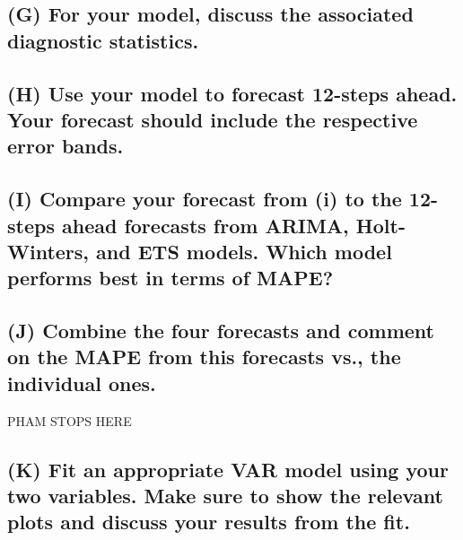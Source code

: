 \documentclass[
  10.5pt,
]{article}
\begin{document}
\hypertarget{g-for-your-model-discuss-the-associated-diagnostic-statistics.}{%
\subsection{(G) For your model, discuss the associated diagnostic
statistics.}\label{g-for-your-model-discuss-the-associated-diagnostic-statistics.}}

\hypertarget{h-use-your-model-to-forecast-12-steps-ahead.-your-forecast-should-include-the-respective-error-bands.}{%
\subsection{(H) Use your model to forecast 12-steps ahead. Your forecast
should include the respective error
bands.}\label{h-use-your-model-to-forecast-12-steps-ahead.-your-forecast-should-include-the-respective-error-bands.}}

\hypertarget{i-compare-your-forecast-from-i-to-the-12-steps-ahead-forecasts-from-arima-holt-winters-and-ets-models.-which-model-performs-best-in-terms-of-mape}{%
\subsection{(I) Compare your forecast from (i) to the 12-steps ahead
forecasts from ARIMA, Holt-Winters, and ETS models. Which model performs
best in terms of
MAPE?}\label{i-compare-your-forecast-from-i-to-the-12-steps-ahead-forecasts-from-arima-holt-winters-and-ets-models.-which-model-performs-best-in-terms-of-mape}}

\hypertarget{j-combine-the-four-forecasts-and-comment-on-the-mape-from-this-forecasts-vs.-the-individual-ones.}{%
\subsection{(J) Combine the four forecasts and comment on the MAPE from
this forecasts vs., the individual
ones.}\label{j-combine-the-four-forecasts-and-comment-on-the-mape-from-this-forecasts-vs.-the-individual-ones.}}

PHAM STOPS HERE

\hypertarget{k-fit-an-appropriate-var-model-using-your-two-variables.-make-sure-to-show-the-relevant-plots-and-discuss-your-results-from-the-fit.}{%
\subsection{(K) Fit an appropriate VAR model using your two variables.
Make sure to show the relevant plots and discuss your results from the
fit.}\label{k-fit-an-appropriate-var-model-using-your-two-variables.-make-sure-to-show-the-relevant-plots-and-discuss-your-results-from-the-fit.}}
\end{document}
